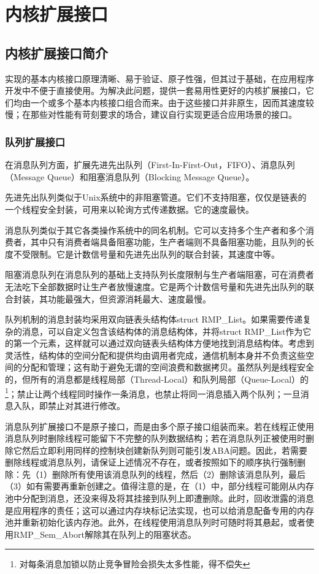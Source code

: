 \chapter{内核扩展接口}\label{ch:kernel-extension-interfaces}

\section{内核扩展接口简介}\label{sec:kernel-extension-interface-introduction}

实现的基本内核接口原理清晰、易于验证、原子性强，但其过于基础，在应用程序开发中不便于直接使用。为解决此问题，提供一套易用性更好的内核扩展接口，它们均由一个或多个基本内核接口组合而来。由于这些接口并非原生，因而其速度较慢；在那些对性能有苛刻要求的场合，建议自行实现更适合应用场景的接口。

\subsection{队列扩展接口}\label{subsec:queue-extension-interface}

在消息队列方面，扩展先进先出队列（First-In-First-Out，FIFO）、消息队列（Message
Queue）和阻塞消息队列（Blocking Message Queue）。

先进先出队列类似于Unix系统中的非阻塞管道。它们不支持阻塞，仅仅是链表的一个线程安全封装，可用来以轮询方式传递数据。它的速度最快。

消息队列类似于其它各类操作系统中的同名机制。它可以支持多个生产者和多个消费者，其中只有消费者端具备阻塞功能，生产者端则不具备阻塞功能，且队列的长度不受限制。它是计数信号量和先进先出队列的联合封装，其速度中等。

阻塞消息队列在消息队列的基础上支持队列长度限制与生产者端阻塞，可在消费者无法吃下全部数据时让生产者放慢速度。它是两个计数信号量和先进先出队列的联合封装，其功能最强大，但资源消耗最大、速度最慢。

队列机制的消息封装均采用双向链表头结构体struct
RMP\_List。如果需要传递复杂的消息，可以自定义包含该结构体的消息结构体，并将struct
RMP\_List作为它的第一个元素，这样就可以通过双向链表头结构体方便地找到消息结构体。考虑到灵活性，结构体的空间分配和提供均由调用者完成，通信机制本身并不负责这些空间的分配和管理；这有助于避免无谓的空间浪费和数据拷贝。虽然队列是线程安全的，但所有的消息都是线程局部（Thread-Local）和队列局部（Queue-Local）的\footnote{对每条消息加锁以防止竞争冒险会损失太多性能，得不偿失}；禁止让两个线程同时操作一条消息，也禁止将同一消息插入两个队列；一旦消息入队，即禁止对其进行修改。

消息队列扩展接口不是原子接口，而是由多个原子接口组装而来。若在线程正使用消息队列时删除线程可能留下不完整的队列数据结构；若在消息队列正被使用时删除它然后立即利用同样的控制块创建新队列则可能引发ABA问题。因此，若需要删除线程或消息队列，请保证上述情况不存在，或者按照如下的顺序执行强制删除：先（1）删除所有使用该消息队列的线程，然后（2）删除该消息队列，最后（3）如有需要再重新创建之。值得注意的是，在（1）中，部分线程可能刚从内存池中分配到消息，还没来得及将其挂接到队列上即遭删除。此时，回收泄露的消息是应用程序的责任；这可以通过内存块标记法实现，也可以给消息配备专用的内存池并重新初始化该内存池。此外，在线程使用消息队列时可随时将其悬起，或者使用RMP\_Sem\_Abort解除其在队列上的阻塞状态。

